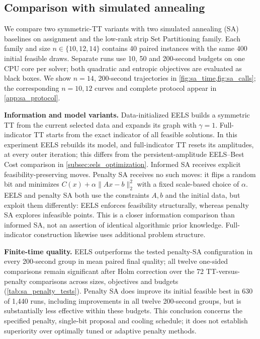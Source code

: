 \subsection{Comparison with simulated annealing}
\label{subsec:sa_comparison}
We compare two symmetric-TT variants with two simulated annealing (SA)
baselines on assignment and the low-rank strip Set Partitioning family.
Each family and size $n\in\{10,12,14\}$ contains 40 paired instances with
the same 400 initial feasible draws. Separate runs use 10, 50 and 200-second
budgets on one CPU core per solver; both quadratic and entropic objectives
are evaluated as black boxes. We show $n=14$, 200-second trajectories in
\cref{fig:sa_time,fig:sa_calls}; the corresponding $n=10,12$ curves and
complete protocol appear in \cref{app:sa_protocol}.

\textbf{Information and model variants.} Data-initialized EELS builds a
symmetric TT from the current selected data and expands its graph with
$\gamma=1$. Full-indicator TT starts from the exact indicator of all feasible
solutions. In this experiment EELS rebuilds its model, and full-indicator TT
resets its amplitudes, at every outer iteration; this differs from the
persistent-amplitude EELS--Best Cost comparison in
\cref{subsec:eels_optimization}. Informed SA receives explicit
feasibility-preserving moves. Penalty SA receives no such moves: it flips a
random bit and minimizes $C(x)+\alpha\|Ax-b\|_2^2$ with a fixed scale-based
choice of $\alpha$. EELS and penalty SA both use the constraints $A,b$ and
the initial data, but exploit them differently: EELS enforces feasibility
structurally, whereas penalty SA explores infeasible points. This is a closer
information comparison than informed SA, not an assertion of identical
algorithmic prior knowledge. Full-indicator construction likewise uses
additional problem structure.

\textbf{Finite-time quality.} EELS outperforms the tested penalty-SA
configuration in every 200-second group in mean paired final quality;
all twelve one-sided comparisons remain significant after Holm correction
over the 72 TT-versus-penalty comparisons across sizes, objectives and budgets
(\cref{tab:sa_penalty_tests}). Penalty SA does improve its initial feasible
best in 630 of 1,440 runs, including improvements in all twelve 200-second
groups, but is substantially less effective within these budgets. This
conclusion concerns the specified penalty, single-bit proposal and cooling
schedule; it does not establish superiority over optimally tuned or adaptive
penalty methods.

